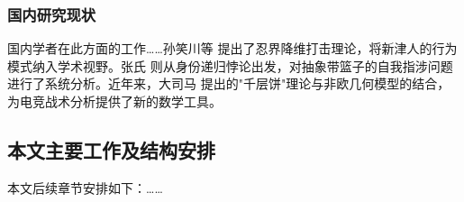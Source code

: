 \subsubsection{国内研究现状}
国内学者在此方面的工作……孙笑川等\cite{gill1985} 提出了忍界降维打击理论，将新津人的行为模式纳入学术视野。张氏\cite{zhang1983} 则从身份递归悖论出发，对抽象带篮子的自我指涉问题进行了系统分析。近年来，大司马\cite{feng1997} 提出的"千层饼"理论与非欧几何模型的结合，为电竞战术分析提供了新的数学工具。

\subsection{本文主要工作及结构安排}
本文后续章节安排如下：……

